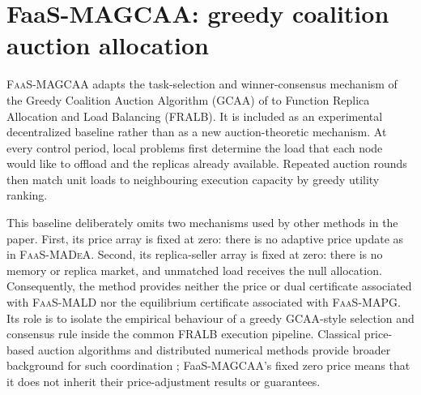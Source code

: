
\section{FaaS-MAGCAA: greedy coalition auction allocation}
\label{sec:magcaa}

\textsc{FaaS-MAGCAA} adapts the task-selection and winner-consensus
mechanism of the Greedy Coalition Auction Algorithm (GCAA) of
\citet{braquetbakolas2021} to Function Replica Allocation and Load Balancing
(FRALB). It is included as an experimental decentralized baseline rather
than as a new auction-theoretic mechanism. At every control period, local
problems first determine the load that each node would like to offload and
the replicas already available. Repeated auction rounds then match unit
loads to neighbouring execution capacity by greedy utility ranking.

This baseline deliberately omits two mechanisms used by other methods in
the paper. First, its price array is fixed at zero: there is no adaptive
price update as in \textsc{FaaS-MADeA}. Second, its replica-seller array is
fixed at zero: there is no memory or replica market, and unmatched load
receives the null allocation. Consequently, the method provides neither the
price or dual certificate associated with \textsc{FaaS-MALD} nor the
equilibrium certificate associated with \textsc{FaaS-MAPG}. Its role is to
isolate the empirical behaviour of a greedy GCAA-style selection and
consensus rule inside the common FRALB execution pipeline.
Classical price-based auction algorithms and distributed numerical methods
provide broader background for such coordination
\citep{bertsekas1988,bertsekas1989}; FaaS-MAGCAA's fixed zero price means that
it does not inherit their price-adjustment results or guarantees.


